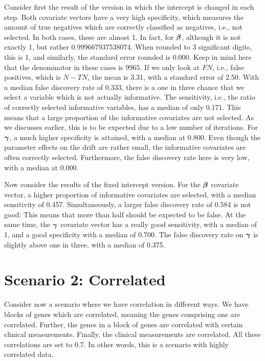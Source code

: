 Consider first the result of the version in which the intercept is changed in each step.
Both covariate vectors have a very high specificity, which measures the amount of true negatives which are correctly classified as negatives, i.e., not selected.
In both cases, these are almost 1.
In fact, for $\boldsymbol{\beta}$, although it is not exactly 1, but rather 0.999667937538074.
When rounded to 3 significant digits, this is 1, and similarly, the standard error rounded is 0.000.
Keep in mind here that the denominator in these cases is 9965.
If we only look at $FN$, i.e., false positives, which is $N-TN$, the mean is 3.31, with a standard error of 2.50.
With a median false discovery rate of 0.333, there is a one in three chance that we select a variable which is not actually informative.
The sensitivity, i.e., the ratio of correctly selected informative variables, has a median of only 0.171.
This means that a large proportion of the informative covariates are not selected.
As we discusses earlier, this is to be expected due to a low number of iterations.
For $\boldsymbol{\gamma}$, a much higher specificity is attained, with a median at 0.800.
Even though the parameter effects on the drift are rather small, the informative covariates are often correctly selected.
Furthermore, the false discovery rate here is very low, with a median at 0.000.

Now consider the results of the fixed intercept version.
For the $\boldsymbol{\beta}$ covariate vector, a higher proportion of informative covariates are selected, with a median sensitivity of 0.457.
Simultaneously, a larger false discovery rate of 0.584 is not good: This means that more than half should be expected to be false.
At the same time, the $\boldsymbol{\gamma}$ covariate vector has a really good sensitivity, with a median of 1, and a good specificity with a median of 0.700.
The false discovery rate on $\boldsymbol{\gamma}$ is slightly above one in three, with a median of 0.375.

\section{Scenario 2: Correlated}
Consider now a scenario where we have correlation in different ways.
We have blocks of genes which are correlated, meaning the genes comprising one are correlated.
Further, the genes in a block of genes are correlated with certain clinical measurements.
Finally, the clinical measurements are correlated.
All these correlations are set to 0.7.
In other words, this is a scenario with highly correlated data.

